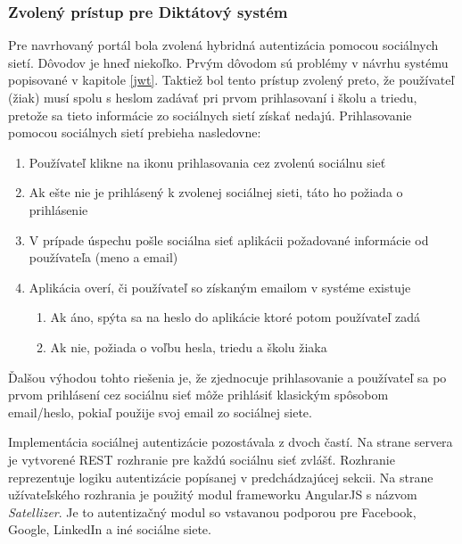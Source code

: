 \documentclass[12pt,oneside]{fithesis2}
\begin{document}
      		\subsubsection{Zvolený prístup pre Diktátový systém}
      		\par Pre navrhovaný portál bola zvolená hybridná autentizácia pomocou sociálnych sietí. Dôvodov je hneď niekoľko. Prvým dôvodom sú problémy v návrhu systému popisované v kapitole \ref{jwt}. Taktiež bol tento prístup zvolený preto, že používateľ (žiak) musí spolu s heslom zadávať pri prvom prihlasovaní i školu a triedu, pretože sa tieto informácie zo sociálnych sietí získať nedajú. Prihlasovanie pomocou sociálnych sietí prebieha nasledovne: 
      		\begin{enumerate}
      		\item Používateľ klikne na ikonu prihlasovania cez zvolenú sociálnu sieť
      		\item Ak ešte nie je prihlásený k zvolenej sociálnej sieti, táto ho požiada o prihlásenie
      		\item V prípade úspechu pošle sociálna sieť aplikácii požadované informácie od používateľa (meno a email)
      		\item Aplikácia overí, či používateľ so získaným emailom v systéme existuje
\begin{enumerate}

      		\item Ak áno, spýta sa na heslo do aplikácie ktoré potom používateľ zadá
      		\item Ak nie, požiada o voľbu hesla, triedu a školu žiaka
\end{enumerate}
      		\end{enumerate}
      		
Ďalšou výhodou tohto riešenia je, že zjednocuje prihlasovanie a používateľ sa po prvom prihlásení cez sociálnu sieť môže prihlásiť klasickým spôsobom email/heslo, pokiaľ použije svoj email zo sociálnej siete.
			\par Implementácia sociálnej autentizácie pozostávala z dvoch častí. Na strane servera je vytvorené REST rozhranie pre každú sociálnu sieť zvlášť. Rozhranie reprezentuje logiku autentizácie popísanej v predchádzajúcej sekcii. Na strane užívateľského rozhrania je použitý modul frameworku AngularJS s názvom \textit{Satellizer}. Je to autentizačný modul so vstavanou podporou pre Facebook, Google, LinkedIn a iné sociálne siete\cite{yalkabov14}.
      		
\end{document}
